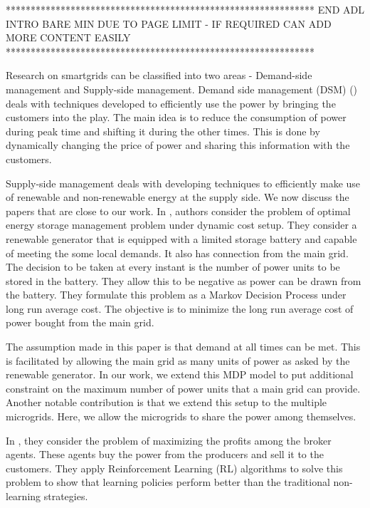 **************************************************************
END ADL INTRO BARE MIN DUE TO PAGE LIMIT - IF REQUIRED CAN ADD MORE CONTENT EASILY
**************************************************************

Research on smartgrids can be classified into two areas -  Demand-side management and Supply-side management. Demand side management (DSM) (\cite{logenthiran2011multi, wang2010demand,dsm1,dsm2,dsm3,dsm4}) deals with techniques developed to efficiently use the power by bringing the customers into the play. The main idea is to reduce the consumption of power during peak time and shifting it during the other times. This is done by dynamically changing the price of power and sharing this information with the customers. 

Supply-side management deals with developing techniques to efficiently make use of renewable and non-renewable energy at the supply side. We now discuss the papers that are close to our work. In \cite{PHarsha}, authors consider the problem of optimal energy storage management problem under dynamic cost setup. They consider a renewable generator that is equipped with a limited storage battery and capable of meeting the some local demands. It also has connection from the main grid. The decision to be taken at every instant is the number of power units to be stored in the battery. They allow this to be negative as power can be drawn from the battery. They formulate this problem as a Markov Decision Process under long run average cost. The objective is to minimize the long run average cost of power bought from the main grid.

The assumption made in this paper is that demand at all times can be met. This is facilitated by allowing the main grid as many units of power as asked by the renewable generator. In our work, we extend this MDP model to put additional constraint on the maximum number of power units that a main grid can provide. Another notable contribution is that we extend this setup to the multiple microgrids. Here, we allow the microgrids to share the power among themselves.  

In \cite{reddy2011learned}, they consider the problem of maximizing the profits among the broker agents. These agents buy the power from the producers and sell it to the customers. They apply Reinforcement Learning (RL) algorithms to solve this problem to show that learning policies perform better than the traditional non-learning strategies.

